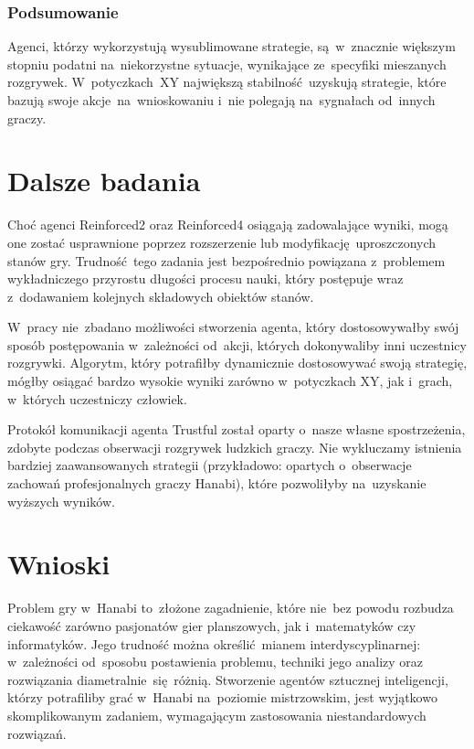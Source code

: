 \documentclass[declaration,shortabstract,inz]{iithesis}
\begin{document}
\subsection*{Podsumowanie}

Agenci, którzy wykorzystują wysublimowane strategie, są~w~znacznie większym stopniu podatni na~niekorzystne sytuacje, wynikające ze~specyfiki mieszanych rozgrywek. W~potyczkach~XY największą stabilność uzyskują strategie, które bazują swoje akcje na~wnioskowaniu i~nie polegają na~sygnałach od~innych graczy.

\chapter{Dalsze badania}

Choć agenci Reinforced2 oraz Reinforced4 osiągają zadowalające wyniki, mogą one zostać usprawnione poprzez rozszerzenie lub modyfikację uproszczonych stanów gry. Trudność tego zadania jest bezpośrednio powiązana z~problemem wykładniczego przyrostu długości procesu nauki, który postępuje wraz z~dodawaniem kolejnych składowych obiektów stanów.

W~pracy nie~zbadano możliwości stworzenia agenta, który dostosowywałby swój sposób postępowania w~zależności od~akcji, których dokonywaliby inni uczestnicy rozgrywki. Algorytm, który potrafiłby dynamicznie dostosowywać swoją strategię, mógłby osiągać bardzo wysokie wyniki zarówno w~potyczkach XY, jak i~grach, w~których uczestniczy człowiek.

Protokół komunikacji agenta Trustful został oparty o~nasze własne spostrzeżenia, zdobyte podczas obserwacji rozgrywek ludzkich graczy. Nie wykluczamy istnienia bardziej zaawansowanych strategii (przykładowo: opartych o~obserwacje zachowań profesjonalnych graczy Hanabi), które pozwoliłyby na~uzyskanie wyższych wyników.

\chapter{Wnioski}

Problem gry w~Hanabi to~złożone zagadnienie, które nie~bez powodu rozbudza ciekawość zarówno pasjonatów gier planszowych, jak i~matematyków czy informatyków. Jego trudność można określić mianem interdyscyplinarnej: w~zależności od~sposobu postawienia problemu, techniki jego analizy oraz rozwiązania diametralnie~się różnią. Stworzenie agentów sztucznej inteligencji, którzy potrafiliby grać w~Hanabi na~poziomie mistrzowskim, jest wyjątkowo skomplikowanym zadaniem, wymagającym zastosowania niestandardowych rozwiązań.
\end{document}
